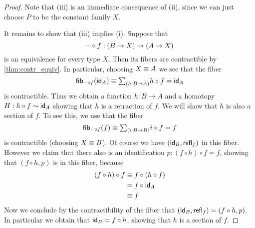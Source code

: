 \begin{proof}
Note that (iii) is an immediate consequence of (ii), since we can just choose $P$ to be the constant family $X$.

It remains to show that (iii) implies (i). Suppose that
\begin{equation*}
\blank\circ f:(B\to X)\to (A\to X)
\end{equation*}
is an equivalence for every type $X$. Then its fibers are contractible by \cref{thm:contr_equiv}. In particular, choosing $X\jdeq A$ we see that the fiber
\begin{equation*}
\fib{\blank\circ f}{\idfunc[A]}\jdeq \sm{h:B\to A}h\circ f=\idfunc[A]
\end{equation*}
is contractible. Thus we obtain a function $h:B\to A$ and a homotopy $H:h\circ f\htpy\idfunc[A]$ showing that $h$ is a retraction of $f$. We will show that $h$ is also a section of $f$. To see this, we use that the fiber
\begin{equation*}
\fib{\blank\circ f}{f}\jdeq \sm{i:B\to B} i\circ f=f
\end{equation*}
is contractible (choosing $X\jdeq B$). 
Of course we have $(\idfunc[B],\refl{f})$ in this fiber. However we claim that there also is an identification $p:(f\circ h)\circ f=f$, showing that $(f\circ h,p)$ is in this fiber, because
\begin{align*}
(f\circ h)\circ f & \jdeq f\circ (h\circ f) \\
& = f\circ \idfunc[A] \\
& \jdeq f
\end{align*}
Now we conclude by the contractibility of the fiber that $(\idfunc[B],\refl{f})=(f\circ h,p)$. In particular we obtain that $\idfunc[B]=f\circ h$, showing that $h$ is a section of $f$.
\end{proof}

